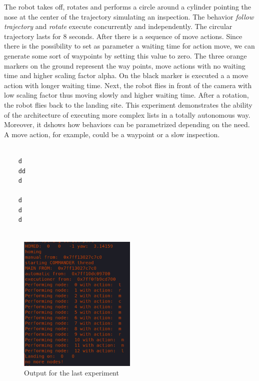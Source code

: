 The robot takes off, rotates and performs a circle around a cylinder pointing the nose at the center of the trajectory simulating an inspection. The behavior \textit{follow trajectory} and \textit{rotate} execute concurrently and independently. The circular trajectory lasts for 8 seconds. After there is a sequence of move actions. Since there is the possibility to set as parameter a waiting time for action move, we can generate some sort of waypoints by setting this value to zero. The three orange markers on the ground represent the way points, move actions with no waiting time and higher scaling factor alpha. On the black marker is executed a a move action with longer waiting time. Next, the robot flies in front of the camera with low scaling factor thus moving slowly and higher waiting time. After a rotation, the robot flies back to the landing site. This experiment demonstrates the ability of the architecture of executing more complex lists in a totally autonomous way. Moreover, it dshows how behaviors can be parametrized depending on the need. A move action, for example, could be a waypoint or a slow inspection.

\begin{verbatim}
	
	d
	dd
	d
	
	d
	d
	d
	
\end{verbatim}

\begin{figure}[h]
\centering
 \includegraphics[width=0.5\textwidth]{snippet.png}
 \caption{Output for the last experiment}
 \label{figure:snip}
\end{figure}













